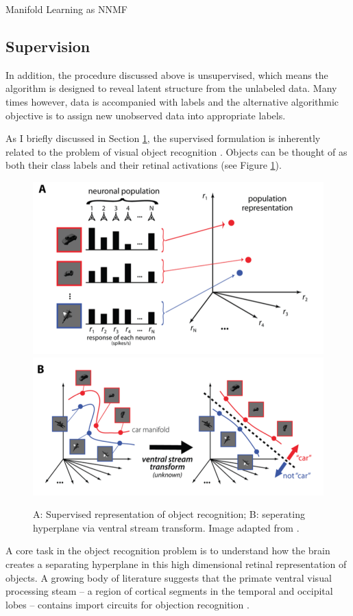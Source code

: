 \documentclass[12pt]{pom_thesis}
\begin{document}
\begin{chapter}{Manifold Learning as NNMF}
	\subsection*{Supervision}
	In addition, the procedure discussed above is unsupervised, which means the algorithm is designed to reveal latent structure from the unlabeled data. Many times however, data is accompanied with labels and the alternative algorithmic objective is to assign new unobserved data into appropriate labels.
	
	As I briefly discussed in Section \ref{manifold}, the supervised formulation is inherently related to the problem of visual object recognition \cite{biederman1987recognition}. Objects can be thought of as both their class labels and their retinal activations (see Figure \ref{manifold}).
\begin{figure}[h]
	\label{manifold}
	\centering
	\includegraphics[width=.42\textwidth]{manifoldA}
		\includegraphics[width=.57\textwidth]{manifoldB}
	\caption{A: Supervised representation of object recognition; B: seperating hyperplane via ventral stream transform. Image adapted from \cite{dicarlo2012does}.}
\end{figure}	

	A core task in the object recognition problem is to understand how the brain creates a separating hyperplane in this high dimensional retinal representation of objects. A growing body of literature suggests that the primate ventral visual processing steam -- a region of cortical segments in the temporal and occipital lobes -- contains import circuits for objection recognition \cite{gross1994inferior, dicarlo2012does, miyashita1993inferior, orban2008higher, rolls2000functions}. 
	

\end{chapter}
\end{document}
